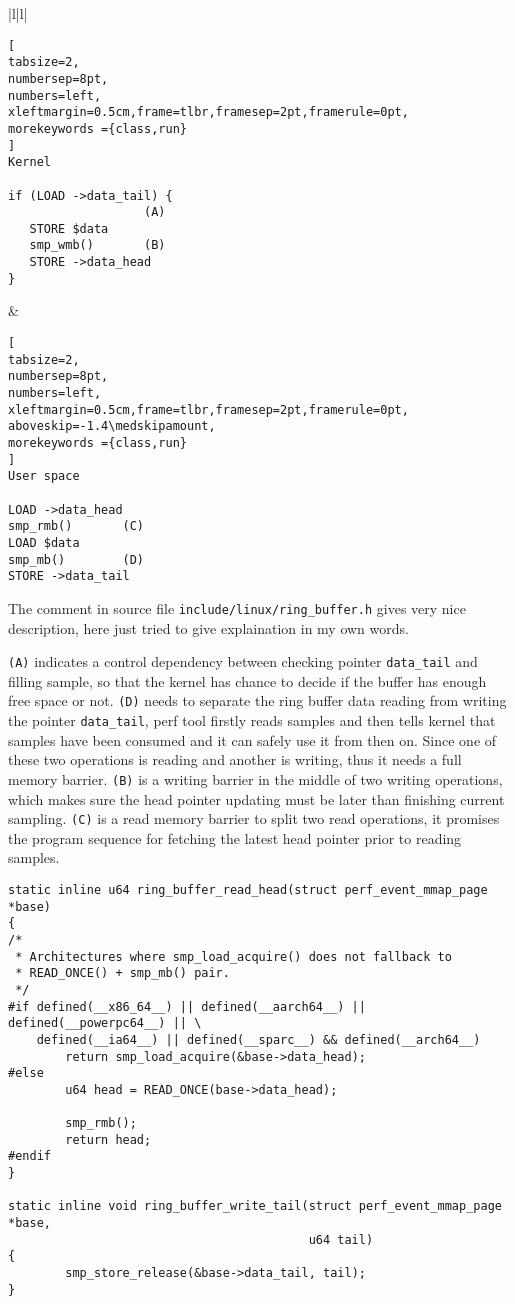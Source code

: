 \documentclass[11pt]{diazessay} %
\def\code#1{\texttt{#1}}
\begin{document}
\begin{tabular}{|l|l|}
\begin{minipage}{.4\textwidth}
\begin{lstlisting}[
tabsize=2,
numbersep=8pt,
numbers=left,
xleftmargin=0.5cm,frame=tlbr,framesep=2pt,framerule=0pt,
morekeywords ={class,run}
]
Kernel

if (LOAD ->data_tail) {
                   (A)
   STORE $data
   smp_wmb()       (B)
   STORE ->data_head
}
\end{lstlisting}
\end{minipage}

&

\begin{minipage}{.4\textwidth}
\begin{lstlisting}[
tabsize=2,
numbersep=8pt,
numbers=left,
xleftmargin=0.5cm,frame=tlbr,framesep=2pt,framerule=0pt,
aboveskip=-1.4\medskipamount,
morekeywords ={class,run}
]
User space

LOAD ->data_head
smp_rmb()       (C)
LOAD $data
smp_mb()        (D)
STORE ->data_tail
\end{lstlisting}
\end{minipage}
\end{tabular}

The comment in source file \code{include/linux/ring\_buffer.h} gives very nice description, here just tried to give explaination in my own words.

\code{(A)} indicates a control dependency between checking pointer \code{data\_tail} and filling sample, so that the kernel has chance to decide if the buffer has enough free space or not.  \code{(D)} needs to separate the ring buffer data reading from writing the pointer \code{data\_tail}, perf tool firstly reads samples and then tells kernel that samples have been consumed and it can safely use it from then on.  Since one of these two operations is reading and another is writing, thus it needs a full memory barrier.  \code{(B)} is a writing barrier in the middle of two writing operations, which makes sure the head pointer updating must be later than finishing current sampling.  \code{(C)} is a read memory barrier to split two read operations, it promises the program sequence for fetching the latest head pointer prior to reading samples.

\begin{lstlisting}
static inline u64 ring_buffer_read_head(struct perf_event_mmap_page *base)
{
/*
 * Architectures where smp_load_acquire() does not fallback to
 * READ_ONCE() + smp_mb() pair.
 */
#if defined(__x86_64__) || defined(__aarch64__) || defined(__powerpc64__) || \
    defined(__ia64__) || defined(__sparc__) && defined(__arch64__)
        return smp_load_acquire(&base->data_head);
#else
        u64 head = READ_ONCE(base->data_head);

        smp_rmb();
        return head;
#endif
}

static inline void ring_buffer_write_tail(struct perf_event_mmap_page *base,
                                          u64 tail)
{
        smp_store_release(&base->data_tail, tail);
}
\end{lstlisting}
\end{document}
